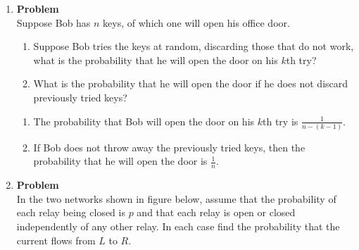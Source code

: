 \documentclass[12pt]{article}
\newenvironment{Ex}{\textbf{Problem}\vspace{.75em}\\}{}
\begin{document}
\begin{enumerate}
\begin{Ex}
\begin{solution}
      \end{solution}
    \end{Ex}
  \item
    \begin{Ex}
      Suppose Bob has $n$ keys, of which one will open his office
      door.
      \begin{enumerate}
      \item Suppose Bob tries the keys at random, discarding those
        that do not work, what is the probability that he will open
        the door on his $k$th try?
      \item What is the probability that he will open the door if he
        does not discard previously tried keys?
      \end{enumerate}
      \begin{solution} \hfill
        \begin{enumerate}
        \item The probability that Bob will open the door on his $k$th
          try is $\frac{1}{n-(k-1)}$.
        \item If Bob does not throw away the previously tried keys,
          then the probability that he will open the door is $\frac{1}{n}$.
        \end{enumerate}
      \end{solution}
    \end{Ex}
  \item
    \begin{Ex}
      In the two networks shown in figure below, assume that the
      probability of each relay being closed is $p$ and that each
      relay is open or closed independently of any other relay. In
      each case find the probability that the current flows from $L$
      to $R$.


\end{Ex}
\end{enumerate}
\end{document}
